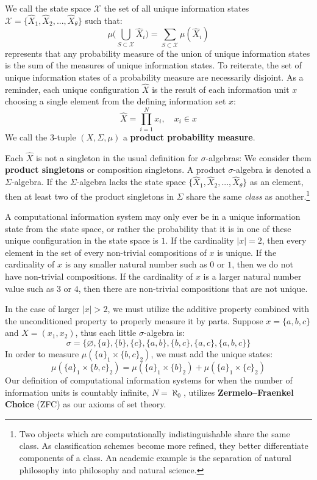 \documentclass[10pt, a5paper, twoside, openright]{memoir}
\begin{document}
We call the state space $\mathcal X$ the set of all unique information states $\mathcal X = \{ \hat X_1, \hat X_2, ..., \hat X_\theta \}$ such that:
$$ \mu \bigg ( \bigcup\limits_{S \subset \mathcal X} \hat X_i \bigg ) = \sum\limits_{S \subset \mathcal X} \mu ( \hat X_i )$$
represents that any probability measure of the union of unique information states is the sum of the measures of unique information states. To reiterate, the set of unique information states of a probability measure are necessarily disjoint. As a reminder, each unique configuration $\hat X$ is the result of each information unit $x$ choosing a single element from the defining information set $x$:
$$\hat X = \prod\limits^{N}_{i=1} x_i, \quad x_i \in x$$
We call the $3$-tuple $(X, \Sigma, \mu)$ a \textbf{product probability measure}. 

Each $\hat X$ is not a singleton in the usual definition for $\sigma$-algebras: We consider them \textbf{product singletons} or composition singletons. A product $\sigma$-algebra is denoted a $\Sigma$-algebra. If the $\Sigma$-algebra lacks the state space $\{ \hat X_1, \hat X_2, ..., \hat X_\theta \}$ as an element, then at least two of the product singletons in $\Sigma$ share the same \textit{class} as another.\footnote{Two objects which are computationally indistinguishable share the same class. As classification schemes become more refined, they better differentiate components of a class. An academic example is the separation of natural philosophy into philosophy and natural science.}

A computational information system may only ever be in a unique information state from the state space, or rather the probability that it is in one of these unique configuration in the state space is $1$. If the cardinality $|x| = 2$, then every element in the set of every non-trivial compositions of $x$ is unique. If the cardinality of $x$ is any smaller natural number such as $0$ or $1$, then we do not have non-trivial compositions. If the cardinality of $x$ is a larger natural number value such as $3$ or $4$, then there are non-trivial compositions that are not unique. 

In the case of larger $|x| > 2$, we must utilize the additive property combined with the unconditioned property to properly measure it by parts. Suppose $x = \{a, b, c\}$ and $X = (x_1, x_2)$, thus each little $\sigma$-algebra is:
$$\sigma = \{\varnothing, \{a\}, \{b\}, \{c\}, \{a, b\}, \{b,c\}, \{a, c\}, \{a, b, c\}\}$$
In order to measure $\mu(\{a\}_1 \times \{b, c\}_2)$, we must add the unique states:
$$\mu(\{a\}_1 \times \{b, c\}_2) = \mu(\{a\}_1 \times \{b\}_2) + \mu(\{a\}_1 \times \{c\}_2)$$
Our definition of computational information systems for when the number of information units is countably infinite, $N = \aleph_0$, utilizes \textbf{Zermelo–Fraenkel Choice} (ZFC) as our axioms of set theory.
\end{document}
